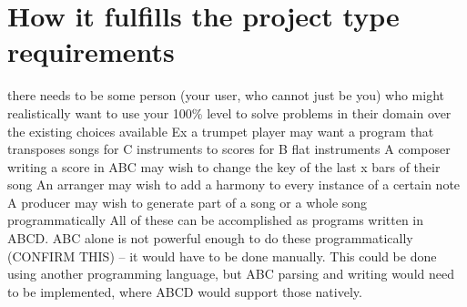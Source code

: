 \section{How it fulfills the project type requirements}

there needs to be some person (your user, who cannot just be you) who might realistically want to use your 100\% level to solve problems in their domain over the existing choices available
Ex a trumpet player may want a program that transposes songs for C instruments to scores for B flat instruments
A composer writing a score in ABC may wish to change the key of the last x bars of their song
An arranger may wish to add a harmony to every instance of a certain note
A producer may wish to generate part of a song or a whole song programmatically
All of these can be accomplished as programs written in ABCD. ABC alone is not powerful enough to do these programmatically (CONFIRM THIS) -- it would have to be done manually. This could be done using another programming language, but  ABC parsing and writing would need to be implemented, where ABCD would support those natively.